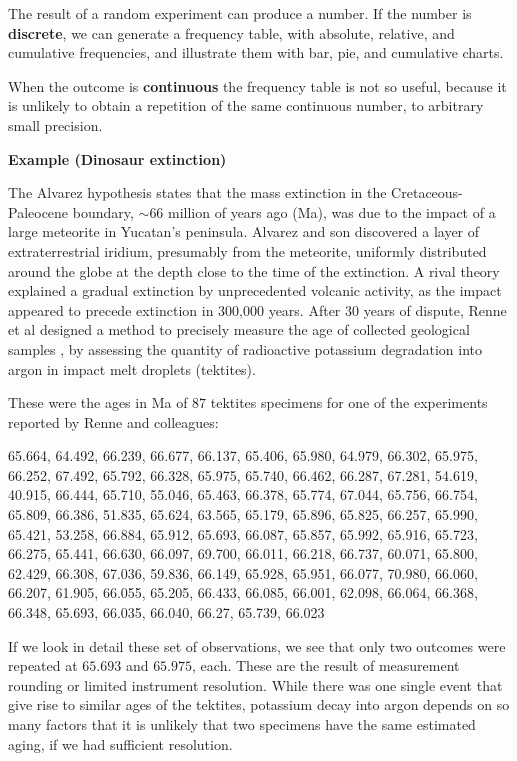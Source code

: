 \documentclass[
]{book}
\begin{document}
The result of a random experiment can produce a number. If the number is \textbf{discrete}, we can generate a frequency table, with absolute, relative, and cumulative frequencies, and illustrate them with bar, pie, and cumulative charts.

When the outcome is \textbf{continuous} the frequency table is not so useful, because it is unlikely to obtain a repetition of the same continuous number, to arbitrary small precision.

\textbf{Example (Dinosaur extinction)}

The Alvarez hypothesis states that the mass extinction in the Cretaceous-Paleocene boundary, \(\sim 66\) million of years ago (Ma), was due to the impact of a large meteorite in Yucatan's peninsula. Alvarez and son discovered a layer of extraterrestrial iridium, presumably from the meteorite, uniformly distributed around the globe at the depth close to the time of the extinction. A rival theory explained a gradual extinction by unprecedented volcanic activity, as the impact appeared to precede extinction in 300,000 years. After 30 years of dispute, Renne et al designed a method to precisely measure the age of collected geological samples \citep{Renne2013}, by assessing the quantity of radioactive potassium degradation into argon in impact melt droplets (tektites).

These were the ages in Ma of \(87\) tektites specimens for one of the experiments reported by Renne and colleagues:

65.664, 64.492, 66.239, 66.677, 66.137, 65.406, 65.980, 64.979, 66.302, 65.975, 66.252, 67.492, 65.792, 66.328, 65.975, 65.740, 66.462, 66.287, 67.281, 54.619, 40.915, 66.444, 65.710, 55.046, 65.463, 66.378, 65.774, 67.044, 65.756, 66.754, 65.809, 66.386, 51.835, 65.624, 63.565, 65.179, 65.896, 65.825, 66.257, 65.990, 65.421, 53.258, 66.884, 65.912, 65.693, 66.087, 65.857, 65.992, 65.916, 65.723, 66.275, 65.441, 66.630, 66.097, 69.700, 66.011, 66.218, 66.737, 60.071, 65.800, 62.429, 66.308, 67.036, 59.836, 66.149, 65.928, 65.951, 66.077, 70.980, 66.060, 66.207, 61.905, 66.055, 65.205, 66.433, 66.085, 66.001, 62.098, 66.064, 66.368, 66.348, 65.693, 66.035, 66.040, 66.27, 65.739, 66.023

If we look in detail these set of observations, we see that only two outcomes were repeated at \(65.693\) and \(65.975\), each. These are the result of measurement rounding or limited instrument resolution. While there was one single event that give rise to similar ages of the tektites, potassium decay into argon depends on so many factors that it is unlikely that two specimens have the same estimated aging, if we had sufficient resolution.
\end{document}
